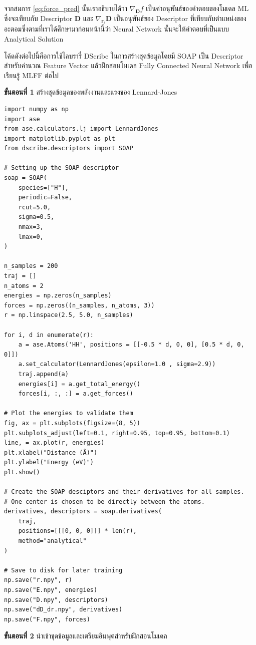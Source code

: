 \noindent จากสมการ \eqref{eq:force_pred} นั้นเราอธิบายได้ว่า $\nabla_{\bm{D}} f$ เป็นค่าอนุพันธ์ของคำตอบของโมเดล ML ซึ่งจะเทียบกับ Descriptor $\bm{D}$ และ $\nabla_{\bm{r}_{i}} \bm{D}$ เป็นอนุพันธ์ของ Descriptor ที่เทียบกับตำแหน่งของอะตอมซึ่งตามที่เราได้ศึกษามาก่อนหน้านี้ว่า Neural Network นั้นจะให้คำตอบที่เป็นแบบ Analytical Solution

โค้ดดังต่อไปนี้คือการใช้ไลบรารี่ DScribe ในการสร้างชุดข้อมูลโดยมี SOAP เป็น Descriptor สำหรับคำนวณ Feature Vector แล้วฝึกสอนโมเดล Fully Connected Neural Network เพื่อเรียนรู้ MLFF ต่อไป

\textbf{ขั้นตอนที่ 1} สร้างชุดข้อมูลของพลังงานและแรงของ Lennard-Jones

\begin{lstlisting}[style=MyPython]
import numpy as np
import ase
from ase.calculators.lj import LennardJones
import matplotlib.pyplot as plt
from dscribe.descriptors import SOAP

# Setting up the SOAP descriptor
soap = SOAP(
    species=["H"],
    periodic=False,
    rcut=5.0,
    sigma=0.5,
    nmax=3,
    lmax=0,
)

n_samples = 200
traj = []
n_atoms = 2
energies = np.zeros(n_samples)
forces = np.zeros((n_samples, n_atoms, 3))
r = np.linspace(2.5, 5.0, n_samples)

for i, d in enumerate(r):
    a = ase.Atoms('HH', positions = [[-0.5 * d, 0, 0], [0.5 * d, 0, 0]])
    a.set_calculator(LennardJones(epsilon=1.0 , sigma=2.9))
    traj.append(a)
    energies[i] = a.get_total_energy()
    forces[i, :, :] = a.get_forces()
	
# Plot the energies to validate them
fig, ax = plt.subplots(figsize=(8, 5))
plt.subplots_adjust(left=0.1, right=0.95, top=0.95, bottom=0.1)
line, = ax.plot(r, energies)
plt.xlabel("Distance (Å)")
plt.ylabel("Energy (eV)")
plt.show()

# Create the SOAP desciptors and their derivatives for all samples. 
# One center is chosen to be directly between the atoms.
derivatives, descriptors = soap.derivatives(
    traj,
    positions=[[[0, 0, 0]]] * len(r),
    method="analytical"
)

# Save to disk for later training
np.save("r.npy", r)
np.save("E.npy", energies)
np.save("D.npy", descriptors)
np.save("dD_dr.npy", derivatives)
np.save("F.npy", forces)
\end{lstlisting}

\vspace{1em}

\textbf{ขั้นตอนที่ 2} นำเข้าชุดข้อมูลและเตรียมอินพุตสำหรับฝึกสอนโมเดล

